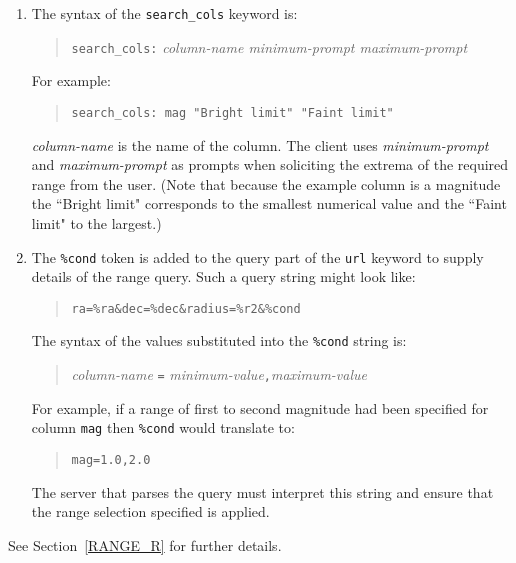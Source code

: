 \documentclass[twoside,11pt,nolof,chapters]{starlink}
\begin{document}
\begin{enumerate}

  \item The syntax of the \texttt{search\_cols} keyword is:

  \begin{quote}
   \texttt{search\_cols:} \textit{column-name minimum-prompt maximum-prompt}
  \end{quote}

   For example:

  \begin{quote}
   \texttt{search\_cols: mag "Bright limit" "Faint limit"}
  \end{quote}

   \textit{column-name}\/ is the name of the column.  The client uses
   \textit{minimum-prompt}\/ and \textit{maximum-prompt}\/ as prompts when
   soliciting the extrema of the required range from the user.  (Note
   that because the example column is a magnitude the ``Bright limit"
   corresponds to the smallest numerical value and the ``Faint limit"
   to the largest.)

  \item The \texttt{\%cond} token is added to the query part of the \texttt{url} keyword to supply details of the range query.  Such a query
   string might look like:

  \begin{quote}
  \verb-ra=%ra&dec=%dec&radius=%r2&%cond-
  \end{quote}

   The syntax of the values substituted into the \texttt{\%cond} string is:

  \begin{quote}
   \textit{column-name}\/ \texttt{=} \textit{minimum-value}\texttt{,}\textit{maximum-value}
  \end{quote}

   For example, if a range of first to second magnitude had been specified
   for column \texttt{mag} then \texttt{\%cond} would translate to:

  \begin{quote}
   \texttt{mag=1.0,2.0}
  \end{quote}

   The server that parses the query must interpret this string and
   ensure that the range selection specified is applied.

\end{enumerate}

See Section~\ref{RANGE_R} for further details.
\end{document}
